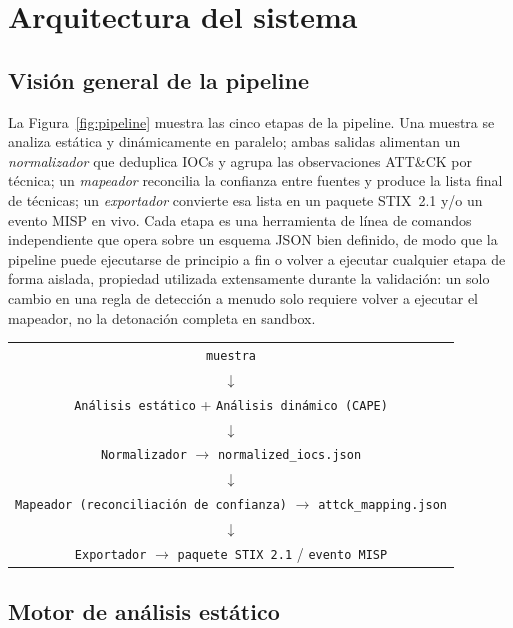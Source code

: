 \section{Arquitectura del sistema}
\label{sec:architecture}

\subsection{Visi\'on general de la pipeline}

La Figura~\ref{fig:pipeline} muestra las cinco etapas de la
pipeline. Una muestra se analiza est\'atica y din\'amicamente en
paralelo; ambas salidas alimentan un \emph{normalizador} que
deduplica IOCs y agrupa las observaciones ATT\&CK por t\'ecnica; un
\emph{mapeador} reconcilia la confianza entre fuentes y produce la
lista final de t\'ecnicas; un \emph{exportador} convierte esa lista en
un paquete STIX~2.1 y/o un evento MISP en vivo. Cada etapa es una
herramienta de l\'inea de comandos independiente que opera sobre un
esquema JSON bien definido, de modo que la pipeline puede ejecutarse
de principio a fin o volver a ejecutar cualquier etapa de forma
aislada, propiedad utilizada extensamente durante la validaci\'on: un
solo cambio en una regla de detecci\'on a menudo solo requiere volver a
ejecutar el mapeador, no la detonaci\'on completa en sandbox.

\begin{center}
\begin{tabular}{c}
\texttt{muestra} \\
$\downarrow$ \\
\texttt{An\'alisis est\'atico} \quad + \quad \texttt{An\'alisis din\'amico (CAPE)} \\
$\downarrow$ \\
\texttt{Normalizador} $\rightarrow$ \texttt{normalized\_iocs.json} \\
$\downarrow$ \\
\texttt{Mapeador (reconciliaci\'on de confianza)} $\rightarrow$ \texttt{attck\_mapping.json} \\
$\downarrow$ \\
\texttt{Exportador} $\rightarrow$ \texttt{paquete STIX 2.1} / \texttt{evento MISP}
\end{tabular}
\label{fig:pipeline}
\end{center}

\subsection{Motor de an\'alisis est\'atico}
\label{sec:static-rules}

